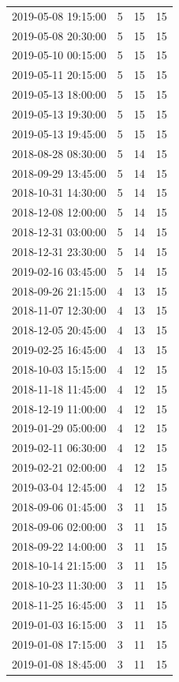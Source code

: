 \begin{tabular}{lrrr}
2019-05-08 19:15:00 & 5 & 15 & 15 \\
2019-05-08 20:30:00 & 5 & 15 & 15 \\
2019-05-10 00:15:00 & 5 & 15 & 15 \\
2019-05-11 20:15:00 & 5 & 15 & 15 \\
2019-05-13 18:00:00 & 5 & 15 & 15 \\
2019-05-13 19:30:00 & 5 & 15 & 15 \\
2019-05-13 19:45:00 & 5 & 15 & 15 \\
2018-08-28 08:30:00 & 5 & 14 & 15 \\
2018-09-29 13:45:00 & 5 & 14 & 15 \\
2018-10-31 14:30:00 & 5 & 14 & 15 \\
2018-12-08 12:00:00 & 5 & 14 & 15 \\
2018-12-31 03:00:00 & 5 & 14 & 15 \\
2018-12-31 23:30:00 & 5 & 14 & 15 \\
2019-02-16 03:45:00 & 5 & 14 & 15 \\
2018-09-26 21:15:00 & 4 & 13 & 15 \\
2018-11-07 12:30:00 & 4 & 13 & 15 \\
2018-12-05 20:45:00 & 4 & 13 & 15 \\
2019-02-25 16:45:00 & 4 & 13 & 15 \\
2018-10-03 15:15:00 & 4 & 12 & 15 \\
2018-11-18 11:45:00 & 4 & 12 & 15 \\
2018-12-19 11:00:00 & 4 & 12 & 15 \\
2019-01-29 05:00:00 & 4 & 12 & 15 \\
2019-02-11 06:30:00 & 4 & 12 & 15 \\
2019-02-21 02:00:00 & 4 & 12 & 15 \\
2019-03-04 12:45:00 & 4 & 12 & 15 \\
2018-09-06 01:45:00 & 3 & 11 & 15 \\
2018-09-06 02:00:00 & 3 & 11 & 15 \\
2018-09-22 14:00:00 & 3 & 11 & 15 \\
2018-10-14 21:15:00 & 3 & 11 & 15 \\
2018-10-23 11:30:00 & 3 & 11 & 15 \\
2018-11-25 16:45:00 & 3 & 11 & 15 \\
2019-01-03 16:15:00 & 3 & 11 & 15 \\
2019-01-08 17:15:00 & 3 & 11 & 15 \\
2019-01-08 18:45:00 & 3 & 11 & 15 \\

\end{tabular}
